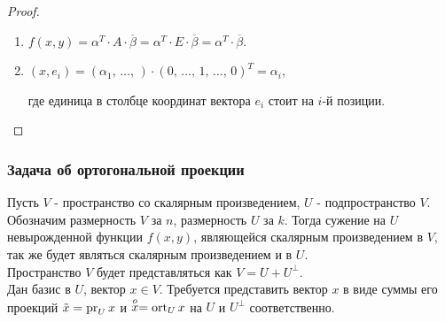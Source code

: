 \begin{proof}~
    \begin{enumerate}
        \item $f(x, y) = \alpha^T \cdot A \cdot \overline{\beta} = \alpha^T \cdot E \cdot \overline{\beta} 
        = \alpha^T \cdot \overline{\beta}$.
        \item $(x, e_i) = (\alpha_1, \,\dots ,\,) \cdot (0, \, \dots , \, 1, \, \dots , \, 0)^T = 
        \alpha_i$, 
        
        где единица в столбце координат вектора $e_i$ стоит на $i$-й позиции.
    \end{enumerate}
\end{proof}

\subsubsection{Задача об ортогональной проекции}

\begin{problem}
    Пусть $V$ - пространство со скалярным произведением, $U$ - подпространство $V$. Обозначим 
    размерность $V$ за $n$, размерность $U$ за $k$. Тогда сужение на $U$
    невырожденной функции $f(x, y)$, являющейся скалярным произведением в $V$, так же будет являться
    скалярным произведением и в $U$. \\
    Пространство $V$ будет представляться как $V = U + U^{\perp}$. \\
    Дан базис в $U$, вектор $x \in V$. Требуется представить вектор $x$ в виде суммы его проекций 
    $\tilde{x} = \operatorname{pr}_U x$ и $\stackrel{o}{x} = \operatorname{ort}_U x$ на $U$ и $U^{\perp}$ соответственно.
\end{problem}

